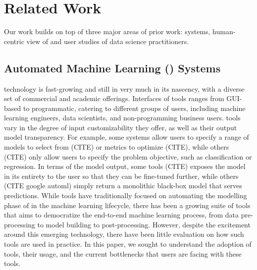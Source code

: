 \section{Related Work}
Our work builds on top of three major areas of prior work: \automl systems, human-centric view of \automl and user studies of data science practitioners. 

\subsection{Automated Machine Learning (\automl) Systems}
\par %
\automl technology is fast-growing and still in very much in its nascency, with a diverse set of commercial and academic offerings. Interfaces of \automl tools ranges from GUI-based to programmatic, catering to different groups of users, including machine learning engineers, data scientists, and non-programming business users. \automl tools vary in the degree of input customizability they offer, as well as their output model transparency. For example, some systems allow users to specify a range of models to select from (CITE) or metrics to optimize (CITE), while others (CITE) only allow users to specify the problem objective, such as classification or regression. In terms of the model output, some tools (CITE) exposes the model in its entirety to the user so that they can be fine-tuned further, while others (CITE google automl) simply return a monolithic black-box model that serves predictions. While \automl tools have traditionally focused on automating the modelling phase of in the machine learning lifecycle, there has been a growing suite of \automl tools that aims to democratize the end-to-end machine learning process, from data pre-processing to model building to post-processing. 
However, despite the excitement around this emerging technology, there have been little evaluation on how such tools are used in practice. In this paper, we sought to understand the adoption of \automl tools, their usage, and the current bottlenecks that users are facing with these tools.




